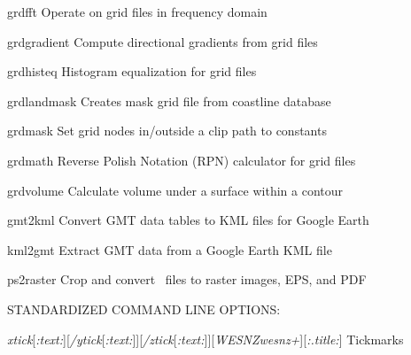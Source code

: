 \documentclass{article}
\begin{document}
\par 	grdfft	Operate on grid files in frequency domain\par 

\par 	grdgradient	Compute directional gradients from grid files\par 

\par 	grdhisteq	Histogram equalization for grid files\par 

\par 	grdlandmask	Creates mask grid file from coastline database\par 

\par 	grdmask	Set grid nodes in/outside a clip path to constants\par 

\par 	grdmath	Reverse Polish Notation (RPN) calculator for grid files\par 

\par 	grdvolume	Calculate volume under a surface within a contour\par 

\par \par 

\par	 gmt2kml	Convert GMT data tables to KML files for Google Earth\par

\par	 kml2gmt	Extract GMT data from a Google Earth KML file\par

\par	 ps2raster	Crop and convert \PS\ files to raster images, EPS, and PDF\par

\par \par 

\par STANDARDIZED COMMAND LINE OPTIONS:\par 

\par {}\emph{xtick}[\emph{:text:}][\emph{/ytick}[\emph{:text:}]][\emph{/ztick}[\emph{:text:}]][\emph{WESNZwesnz+}][\emph{:.title:}]	Tickmarks\par 
\end{document}
